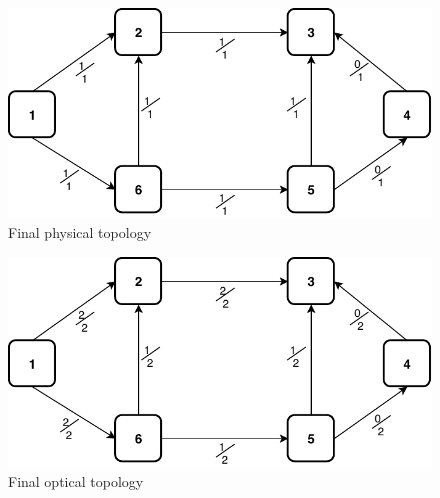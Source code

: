 \begin{figure}[h!]
	\centering
	\includegraphics[width=13cm]{sdf/heuristic/opaque/figures/final_physical_ex}
	\caption{Final physical topology}
	\label{final_physical_ex}
\end{figure}


\begin{figure}[h!]
	\centering
	\includegraphics[width=13cm]{sdf/heuristic/opaque/figures/final_optical_ex}
	\caption{Final optical topology}
	\label{final_optical_ex}
\end{figure}

